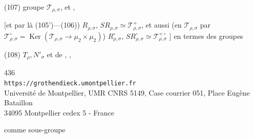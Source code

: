 \noindent(107) groupe $\mathcal{T}_{\rho,\sigma}$, et 
,

[et par là  (105')---(106)) $R_{\rho,\sigma}$,
$SR_{\rho,\sigma}\simeq\mathcal{T}_{\rho,\sigma}^{+}$, et aussi
(en 
$\mathcal{T}_{\rho,\sigma}$ par
$\mathcal{T}_{\rho,\sigma}^{\circ}=\operatorname{Ker}
(\mathcal{T}_{\rho,\sigma}\longrightarrow\mu_2\times\mu_2)$)
$R_{\rho,\sigma}^{\circ}$,
$SR_{\rho,\sigma}^{\circ}\simeq\mathcal{T}_{\rho,\sigma}^{+\circ}$
\unsure{$\Rightarrow$}]
en termes des groupes

\noindent(108) $T_\rho,N'_\sigma$ et de
,
,


\begin{center}
{\small
436\\
\texttt{https://grothendieck.umontpellier.fr}\\
Université de Montpellier, UMR CNRS 5149, Case courrier 051, Place Eugène Bataillon\\
34095 Montpellier cedex 5 - France
}
\end{center}


comme sous-groupe

